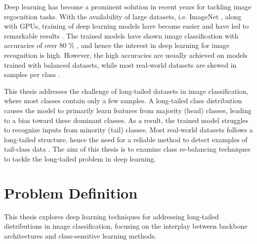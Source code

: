 \label{sec:introduction}

Deep learning has become a prominent solution in recent years for tackling image regocnition tasks. With the availability of large datasets, i.e. ImageNet \cite{ImageNet2009}, along with GPUs, training of deep learning models have become easier and have led to remarkable results \cite{Goodfellow-et-al-2016}. The trained models have shown image classification with accuracies of over 80 \% \cite{he2015deepresiduallearningimage,dosovitskiy2021imageworth16x16words}, and hence the interest in deep learning for image recognition is high. However, the high accuracies are usually achieved on models trained with balanced datasets, while most real-world datasets are skewed in samples per class \cite{vanhorn2017deviltailsfinegrainedclassification,Buda_2018,liu2019largescalelongtailedrecognitionopen}.  

This thesis addresses the challenge of long-tailed datasets in image classification, where most classes contain only a few samples. A long-tailed class distribution causes the model to primarily learn features from majority (head) classes, leading to a bias toward these dominant classes. As a result, the trained model struggles to recognize inputs from minority (tail) classes. Most real-world datasets follows a long-tailed structure, hence the need for a reliable method to detect examples of tail-class data \cite{vanhorn2018inaturalistspeciesclassificationdetection,zhang2023deep}. The aim of this thesis is to examine class re-balancing techniques to tackle the long-tailed problem in deep learning.


\section{Problem Definition}
This thesis explores deep learning techniques for addressing long-tailed distributions in image classification, focusing on the interplay between backbone architectures and class-sensitive learning methods.

